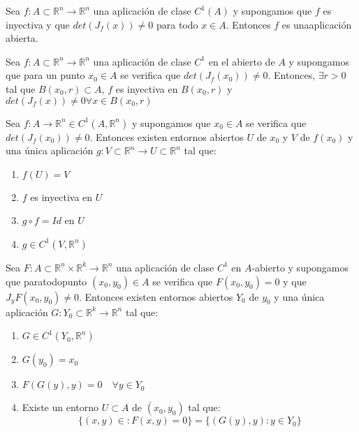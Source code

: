 \begin{corolario}
    Sea $f:A \subset \mathbb{R}^n \to \mathbb{R}^n$ una aplicación de clase $C^1(A)$ y supongamos que $f$ es inyectiva y que $det(J_f(x)) \neq 0$ para todo $x \in A$. Entonces $f$ es unaaplicación abierta.
\end{corolario}

\begin{proposición}
    Sea $f: A \subset \mathbb{R}^n \to \mathbb{R}^n$ una aplicación de clase $C^1$ en el abierto de $A$ y supongamos que para un punto $x_0 \in A$ se verifica que $det(J_f(x_0)) \neq 0$. Entonces, $\exists r > 0$ tal que $B(x_0, r) \subset A$, $f$ es inyectiva en $B(x_0, r)$ y $det(J_f(x)) \neq 0 \forall x \in B(x_0, r)$
\end{proposición}

\begin{teorema}
    Sea $f: A \to \mathbb{R}^n \in C^1(A, \mathbb{R}^n)$ y supongamos que $x_0 \in A$ se verifica que $det(J_f(x_0)) \neq 0$. Entonces existen entornos abiertos $U$ de $x_0$ y $V$ de $f(x_0)$ y una única aplicación $g: V \subset \mathbb{R}^n \to U \subset \mathbb{R}^n$ tal que:
    \begin{enumerate}
        \item $f(U) = V$
        \item $f$ es inyectiva en $U$
        \item $g \circ f = Id$ en $U$
        \item $g \in C^1(V, \mathbb{R}^n)$
    \end{enumerate}
\end{teorema}

\begin{teorema}
    Sea $F: A \subset \mathbb{R}^n \times \mathbb{R}^k \to \mathbb{R}^n$ una aplicación de clase $C^1$ en $A$-abierto y supongamos que paratodopunto $(x_0, y_0) \in A$ se verifica que $F(x_0, y_0) = 0$ y que $J_yF(x_0, y_0) \neq 0$. Entonces existen entornos abiertos $Y_0$ de $y_0$ y una única aplicación $G: Y_0 \subset \mathbb{R}^k \to \mathbb{R}^n$ tal que:
    \begin{enumerate}
        \item $G \in C^1(Y_0, \mathbb{R}^n)$
        \item $G(y_0) = x_0$
        \item $F(G(y), y) = 0 \quad \forall y \in Y_0$
        \item Existe un entorno $U \subset A$ de $(x_0, y_0)$ tal que: 
        $$\{(x, y) \in : F(x,y) = 0\}= \{(G(y), y) : y \in Y_0\}$$
    \end{enumerate}
\end{teorema}

